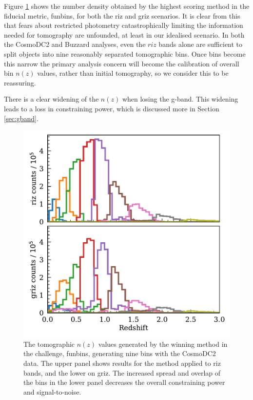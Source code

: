 \documentclass[twocolumn,twocolappendix]{aastex63}
\begin{document}
Figure \ref{fig:funbin_nz} shows the number density obtained by the highest scoring method in
the fiducial metric, {\sc funbins}, for both the riz and griz scenarios.
It is clear from this that fears about restricted photometry catastrophically limiting
the information needed for tomography are unfounded, at least in our idealised scenario.
In both the CosmoDC2 and Buzzard analyses,
even the $riz$ bands alone are sufficient to split objects into nine reasonably separated
tomographic bins.  Once bins become this narrow the primary analysis concern will become the calibration 
of overall bin $n(z)$ values, rather than initial tomography, so we consider this to be reassuring.

There is a clear widening of the $n(z)$ when losing the g-band.  This widening leads to a loss in 
constraining power, which is discussed more in Section \ref{sec:gband}.

\begin{figure}[htbp]
\includegraphics[width=1\linewidth]{results/funbins_nz.pdf}
\caption{The tomographic $n(z)$ values generated by the winning method in the challenge, {\sc funbins},
generating nine bins with the CosmoDC2 data. 
The upper panel shows results for the method applied to riz bands, and the lower on griz. The
increased spread and overlap of the bins in the lower panel decreases the overall constraining
power and signal-to-noise.}
\label{fig:funbin_nz}
\end{figure}
\end{document}
